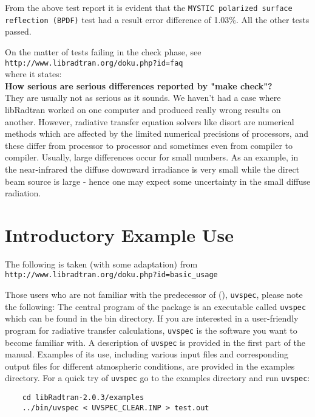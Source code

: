 \begin{enumerate}
From the above test report it is evident that the \lstinline{MYSTIC polarized surface reflection (BPDF)} test had a result error difference of 1.03\%.
All the other tests passed.

On the matter of tests failing in the check phase, see\\
\lstinline{http://www.libradtran.org/doku.php?id=faq}\\
where it states:\\
\textbf{How serious are serious differences reported by "make check"?}\\
They are usually not as serious as it sounds. We haven't had a case where libRadtran worked on one computer and produced really wrong results on another. However, radiative transfer equation solvers like disort are numerical methods which are affected by the limited numerical precisions of processors, and these differ from processor to processor and sometimes even from compiler to compiler. Usually, large differences occur for small numbers. As an example, in the near-infrared the diffuse downward irradiance is very small while the direct beam source is large - hence one may expect some uncertainty in the small diffuse radiation.

\end{enumerate}

\section{Introductory Example Use}

The following is taken (with some adaptation) from \\
\lstinline{http://www.libradtran.org/doku.php?id=basic_usage}

Those users who are not familiar with the predecessor of \libradtran(), \lstinline{uvspec}, please note the following: The central program of the package is an executable called \lstinline{uvspec} which can be found in the bin directory. If you are interested in a user-friendly program for radiative transfer calculations, \lstinline{uvspec} is the software you want to become familiar with. A description of \lstinline{uvspec} is provided in the first part of the manual. Examples of its use, including various input files and corresponding output files for different atmospheric conditions, are provided in the examples directory. For a quick try of \lstinline{uvspec} go to the examples directory and run \lstinline{uvspec}:

\begin{lstlisting}
    cd libRadtran-2.0.3/examples
    ../bin/uvspec < UVSPEC_CLEAR.INP > test.out
\end{lstlisting}



